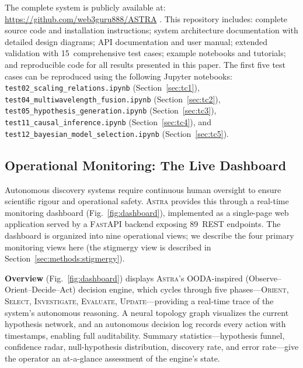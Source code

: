 \documentclass[usenatbib]{rasti}
\newcommand{\astra}{\textsc{Astra}\xspace}
\begin{document}
The complete system is publicly available at: \url{https://github.com/web3guru888/ASTRA} \citep{White2026}.
This repository includes: complete source code and installation instructions; system architecture documentation with detailed design diagrams; API documentation and user manual; extended validation with 15~comprehensive test cases; example notebooks and tutorials; and reproducible code for all results presented in this paper.
The first five test cases can be reproduced using the following Jupyter notebooks:
\texttt{test02\_scaling\_relations.ipynb} (Section~\ref{sec:tc1}),
\texttt{test04\_multiwavelength\_fusion.ipynb} (Section~\ref{sec:tc2}),
\texttt{test05\_hypothesis\_generation.ipynb} (Section~\ref{sec:tc3}),
\texttt{test11\_causal\_inference.ipynb} (Section~\ref{sec:tc4}), and
\texttt{test12\_bayesian\_model\_selection.ipynb} (Section~\ref{sec:tc5}).

\subsection{Operational Monitoring: The Live Dashboard}
\label{sec:methods:dashboard}

Autonomous discovery systems require continuous human oversight to ensure scientific rigour and operational safety.
\astra provides this through a real-time monitoring dashboard (Fig.~\ref{fig:dashboard}), implemented as a single-page web application served by a \textsc{FastAPI} backend exposing 89~REST endpoints.
The dashboard is organized into nine operational views; we describe the four primary monitoring views here (the stigmergy view is described in Section~\ref{sec:methods:stigmergy}).

\textbf{Overview} (Fig.~\ref{fig:dashboard}) displays \astra's OODA-inspired (Observe--Orient--Decide--Act) decision engine, which cycles through five phases---\textsc{Orient}, \textsc{Select}, \textsc{Investigate}, \textsc{Evaluate}, \textsc{Update}---providing a real-time trace of the system's autonomous reasoning.
A neural topology graph visualizes the current hypothesis network, and an autonomous decision log records every action with timestamps, enabling full auditability.
Summary statistics---hypothesis funnel, confidence radar, null-hypothesis distribution, discovery rate, and error rate---give the operator an at-a-glance assessment of the engine's state.
\end{document}
